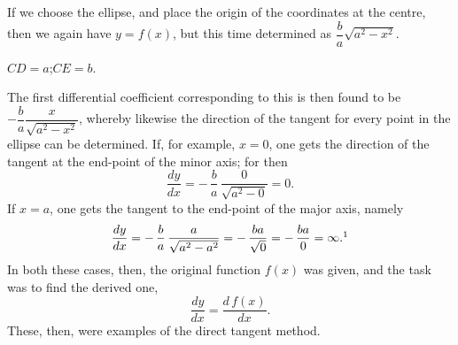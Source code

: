 \documentclass[12pt]{book}
\begin{document}
If we choose the ellipse, and place the origin of the coordinates at the centre, then
we again have $y = f(x)$, but this time determined as
$\dfrac{b}{a}\sqrt{a^{2} - x^{2}}$.

\begin{center}
\end{center}
\begin{center}
$CD = a$;\quad $CE = b$.
\end{center}

The first differential coefficient corresponding to this is then found to be
$-\dfrac{b}{a}\dfrac{x}{\sqrt{a^{2}-x^{2}}}$, whereby likewise the direction of the
tangent for every point in the ellipse can be determined. If, for example, $x = 0$,
one gets the direction of the tangent at the end-point of the minor axis; for then
\[
\frac{dy}{dx} = -\,\frac{b}{a}\,\frac{0}{\sqrt{a^{2}-0}} = 0.
\]
If $x = a$, one gets the tangent to the end-point of the major axis, namely
\[
\frac{dy}{dx} = -\,\frac{b}{a}\,\frac{a}{\sqrt{a^{2}-a^{2}}}
  = -\,\frac{ba}{\sqrt{0}} = -\,\frac{ba}{0} = \infty.\footnotemark
\]
In both these cases, then, the original function $f(x)$ was given, and the task was to
find the derived one,
\[
\frac{dy}{dx} = \frac{d\,f(x)}{dx}.
\]
These, then, were examples of the direct tangent method.
\end{document}
